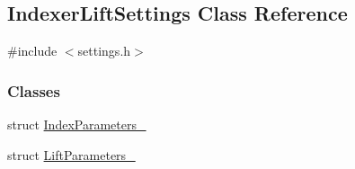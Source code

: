 \hypertarget{classIndexerLiftSettings}{}\subsection{Indexer\+Lift\+Settings Class Reference}
\label{classIndexerLiftSettings}


{\ttfamily \#include $<$settings.\+h$>$}

\subsubsection*{Classes}
\begin{DoxyCompactItemize}
\item 
struct \mbox{\hyperlink{structIndexerLiftSettings_1_1IndexParameters__}{Index\+Parameters\+\_\+}}
\item 
struct \mbox{\hyperlink{structIndexerLiftSettings_1_1LiftParameters__}{Lift\+Parameters\+\_\+}}
\end{DoxyCompactItemize}

